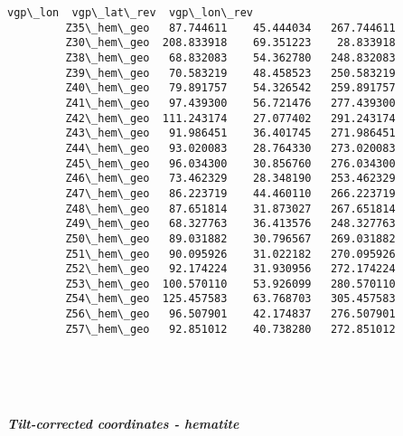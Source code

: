 \documentclass[11pt]{article}
\begin{document}
\begin{Verbatim}[commandchars=\\\{\}]
                         vgp\_lon  vgp\_lat\_rev  vgp\_lon\_rev  
         Z35\_hem\_geo   87.744611    45.444034   267.744611  
         Z30\_hem\_geo  208.833918    69.351223    28.833918  
         Z38\_hem\_geo   68.832083    54.362780   248.832083  
         Z39\_hem\_geo   70.583219    48.458523   250.583219  
         Z40\_hem\_geo   79.891757    54.326542   259.891757  
         Z41\_hem\_geo   97.439300    56.721476   277.439300  
         Z42\_hem\_geo  111.243174    27.077402   291.243174  
         Z43\_hem\_geo   91.986451    36.401745   271.986451  
         Z44\_hem\_geo   93.020083    28.764330   273.020083  
         Z45\_hem\_geo   96.034300    30.856760   276.034300  
         Z46\_hem\_geo   73.462329    28.348190   253.462329  
         Z47\_hem\_geo   86.223719    44.460110   266.223719  
         Z48\_hem\_geo   87.651814    31.873027   267.651814  
         Z49\_hem\_geo   68.327763    36.413576   248.327763  
         Z50\_hem\_geo   89.031882    30.796567   269.031882  
         Z51\_hem\_geo   90.095926    31.022182   270.095926  
         Z52\_hem\_geo   92.174224    31.930956   272.174224  
         Z53\_hem\_geo  100.570110    53.926099   280.570110  
         Z54\_hem\_geo  125.457583    63.768703   305.457583  
         Z56\_hem\_geo   96.507901    42.174837   276.507901  
         Z57\_hem\_geo   92.851012    40.738280   272.851012  
\end{Verbatim}
        

    \begin{center}
    \end{center}
    { \hspace*{\fill} \\}
    

    \begin{center}
    \end{center}
    { \hspace*{\fill} \\}
    
    \subparagraph{Tilt-corrected coordinates -
hematite}\label{tilt-corrected-coordinates---hematite}
\end{document}
